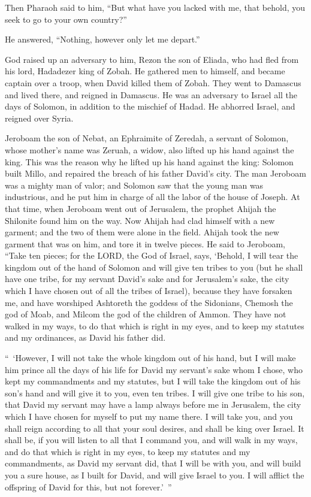 \myverse{}Then Pharaoh said to him, “But what have you lacked with me,
that behold, you seek to go to your own country?”

He answered, “Nothing, however only let me depart.”

\myverse{}God raised up an adversary to him, Rezon the son of Eliada,
who had fled from his lord, Hadadezer king of Zobah.
\myverse{}He gathered men to himself, and became captain over a troop, when David killed
them of Zobah. They went to Damascus and lived there, and reigned in Damascus.
\myverse{}He was an adversary to Israel all the days of Solomon, in addition to the
mischief of Hadad. He abhorred Israel, and reigned over Syria.

\myverse{}Jeroboam the son of Nebat, an Ephraimite of Zeredah, a servant
of Solomon, whose mother’s name was Zeruah, a widow, also lifted up his hand against the king.
\myverse{}This was the reason why he lifted up his hand against the king: Solomon built
Millo, and repaired the breach of his father David’s city.
\myverse{}The man Jeroboam was a mighty man of valor; and Solomon saw that the young
man was industrious, and he put him in charge of all the labor of the house of Joseph.
\myverse{}At that time, when Jeroboam went out of Jerusalem, the prophet Ahijah the
Shilonite found him on the way. Now Ahijah had clad himself with a new garment; and the two of them were
alone in the field.
\myverse{}Ahijah took the new garment that was on him, and tore it in twelve pieces.
\myverse{}He said to Jeroboam, “Take ten pieces; for the LORD, the God of Israel, says,
‘Behold, I will tear the kingdom out of the hand of Solomon and will give ten tribes to you
\myverse{}(but he shall have one tribe, for my servant David’s sake and for Jerusalem’s
sake, the city which I have chosen out of all the tribes of Israel),
\myverse{}because they have forsaken me, and have worshiped Ashtoreth the goddess of
the Sidonians, Chemosh the god of Moab, and Milcom the god of the children of Ammon. They have not walked
in my ways, to do that which is right in my eyes, and to keep my statutes and my ordinances, as David
his father did.

\myverse{}“ ‘However, I will not take the whole kingdom out of his hand,
but I will make him prince all the days of his life for David my servant’s sake whom I chose, who kept
my commandments and my statutes,
\myverse{}but I will take the kingdom out of his son’s hand and will give it to you,
even ten tribes.
\myverse{}I will give one tribe to his son, that David my servant may have a lamp always
before me in Jerusalem, the city which I have chosen for myself to put my name there.
\myverse{}I will take you, and you shall reign according to all that your soul desires,
and shall be king over Israel.
\myverse{}It shall be, if you will listen to all that I command you, and will walk
in my ways, and do that which is right in my eyes, to keep my statutes and my commandments, as David my
servant did, that I will be with you, and will build you a sure house, as I built for David, and will
give Israel to you.
\myverse{}I will afflict the offspring of David for this, but not forever.’ ”

